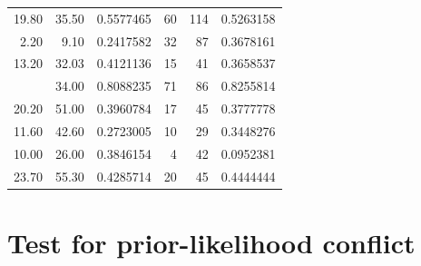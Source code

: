 \documentclass[12pt,a4paper]{article}
\newenvironment{Shaded}{\begin{snugshade}}{\end{snugshade}}
\newcommand{\KeywordTok}[1]{\textcolor[rgb]{0.13,0.29,0.53}{\textbf{#1}}}
\newcommand{\DataTypeTok}[1]{\textcolor[rgb]{0.13,0.29,0.53}{#1}}
\newcommand{\DecValTok}[1]{\textcolor[rgb]{0.00,0.00,0.81}{#1}}
\newcommand{\FloatTok}[1]{\textcolor[rgb]{0.00,0.00,0.81}{#1}}
\newcommand{\StringTok}[1]{\textcolor[rgb]{0.31,0.60,0.02}{#1}}
\newcommand{\CommentTok}[1]{\textcolor[rgb]{0.56,0.35,0.01}{\textit{#1}}}
\newcommand{\OtherTok}[1]{\textcolor[rgb]{0.56,0.35,0.01}{#1}}
\newcommand{\ControlFlowTok}[1]{\textcolor[rgb]{0.13,0.29,0.53}{\textbf{#1}}}
\newcommand{\OperatorTok}[1]{\textcolor[rgb]{0.81,0.36,0.00}{\textbf{#1}}}
\newcommand{\NormalTok}[1]{#1}
\begin{document}
\begin{table}[H]
{\begin{tabular}[t]{rrrrrr}
19.80 & 35.50 & 0.5577465 & 60 & 114 & 0.5263158\\
2.20 & 9.10 & 0.2417582 & 32 & 87 & 0.3678161\\
13.20 & 32.03 & 0.4121136 & 15 & 41 & 0.3658537\\
\addlinespace
27.50 & 34.00 & 0.8088235 & 71 & 86 & 0.8255814\\
20.20 & 51.00 & 0.3960784 & 17 & 45 & 0.3777778\\
11.60 & 42.60 & 0.2723005 & 10 & 29 & 0.3448276\\
10.00 & 26.00 & 0.3846154 & 4 & 42 & 0.0952381\\
23.70 & 55.30 & 0.4285714 & 20 & 45 & 0.4444444\\
\bottomrule
\end{tabular}}
\end{table}

\newpage

\hypertarget{test-for-prior-likelihood-conflict}{%
\section{Test for prior-likelihood
conflict}\label{test-for-prior-likelihood-conflict}}

\begin{Shaded}
\end{Shaded}
\end{document}
